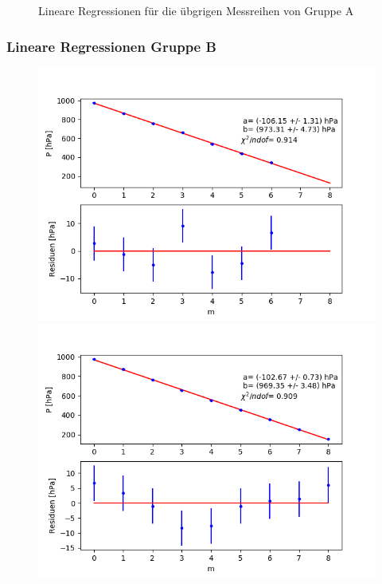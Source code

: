 \documentclass[12pt,a4paper]{article}
\begin{document}
\begin{figure}[H]
\caption{Lineare Regressionen für die übgrigen Messreihen von Gruppe A}
\end{figure}

\subsubsection{Lineare Regressionen Gruppe B}
\begin{figure}[H]
\centering
\includegraphics[scale=0.5]{Bilder/Druck_B_Var2_0.png}
\includegraphics[scale=0.5]{Bilder/Druck_B_Var2_1.png}

\end{figure}
\end{document}
